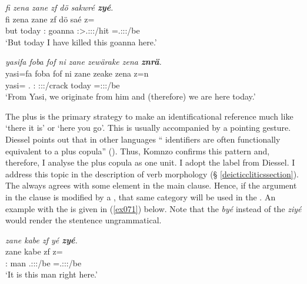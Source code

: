 \begin{exe}
	\ex \emph{fi zena zane zf dö sakwré \textbf{zyé}.}\\
	\gll fi zena zane zf dö saé z=\\
	but today \Dem:\Prox{} \Imm{} goanna \Fsg:\Sbj>\Tsg.\Masc:\Obj:\Rpst:\Pfv/hit \Prox=\Tsg.\Masc:\Sbj:\Nonpast:\Ipfv/be\\
	\trans `But today I have killed this goanna here.'
	\label{ex068}
\end{exe}
\begin{exe}
	\ex \emph{yasifa foba fof ni zane zewärake zena \textbf{znrä}.}\\
	\gll yasi=fa foba fof ni zane zeake zena z=n\\
	yasi=\Abl{} \Dist.\Abl{} \Emph{} \Fnsg{} \Dem:\Prox{} \Fpl:\Sbj:\Pst:\Ipfv/crack today \Prox=\Fpl:\Sbj:\Nonpast:\Ipfv/be\\
	\trans `From Yasi, we originate from him and (therefore) we are here today.'\\
	\label{ex070}
\end{exe}

The   plus  is the primary strategy to make an identificational reference much like  `there it is' or `here you go'. This is usually accompanied by a pointing gesture. Diessel points out that in other languages `` identifiers are often functionally equivalent to a  plus copula'' (\citeyear[10]{Diessel:2009tg}). Thus, Komnzo confirms this pattern and, therefore, I analyse the   plus copula as one unit. I adopt the label   from Diessel. I address this topic in the description of verb morphology (\S{} \ref{deicticcliticssection}).\\

The   always agrees with some element in the main clause. Hence, if the argument in the clause is modified by a  , that same  category will be used in the  . An example with the  is given in (\ref{ex071}) below. Note that the    \emph{byé} instead of the  \emph{ziyé} would render the stentence ungrammatical.

\begin{exe}
	\ex \emph{zane kabe zf yé \textbf{zyé}.}\\
	\gll zane kabe zf  z=\\
	\Dem:\Prox{} man \Imm{} \Tsg.\Masc:\Sbj:\Nonpast:\Ipfv/be \Prox=\Tsg.\Masc:\Sbj:\Nonpast:\Ipfv/be\\
	\trans `It is this man right here.'
	\label{ex071}
\end{exe}

